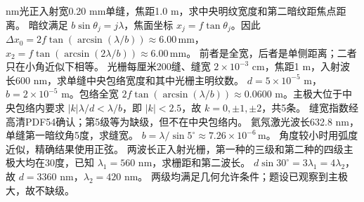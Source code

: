  nm光正入射宽0.20 mm单缝，焦距1.0 m，求中央明纹宽度和第二暗纹距焦点距离。
\workings 暗纹满足 $b\sin\theta_j=j\lambda$，焦面坐标 $x_j=f\tan\theta_j$。因此 $\Delta x_0=2f\tan(\arcsin(\lambda/b))\approx6.00\,\mathrm{mm}$，$x_2=f\tan(\arcsin(2\lambda/b))\approx6.00\,\mathrm{mm}$。
\crosscheck 前者是全宽，后者是单侧距离；二者只在小角近似下相等。
\problemtext 光栅每厘米200缝、缝宽 $2\times10^{-3}$ cm，焦距1 m，入射波长600 nm，求单缝中央包络宽度和其中光栅主明纹数。
\workings $d=5\times10^{-5}$ m，$b=2\times10^{-5}$ m。包络全宽 $2f\tan(\arcsin(\lambda/b))\approx0.0600$ m。主极大位于中央包络内要求 $|k|\lambda/d<\lambda/b$，即 $|k|<2.5$，故 $k=0,\pm1,\pm2$，共5条。
\crosscheck 缝宽指数经高清PDF54确认；第5级等为缺级，但不在中央包络内。
\problemtext 氦氖激光波长632.8 nm，单缝第一暗纹角5度，求缝宽。
\workings $b=\lambda/\sin5^\circ\approx7.26\times10^{-6}\,\mathrm m$。
\crosscheck 角度较小时用弧度近似，精确结果使用正弦。
\problemtext 两波长正入射光栅，第一种的三级和第二种的四级主极大均在30度，已知 $\lambda_1=560$ nm，求栅距和第二波长。
\workings $d\sin30^\circ=3\lambda_1=4\lambda_2$，故 $d=3360$ nm，$\lambda_2=420$ nm。
\crosscheck 两级均满足几何允许条件；题设已观察到主极大，故不缺级。
